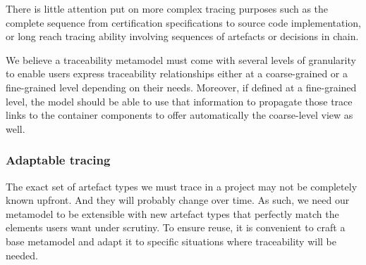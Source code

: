 There is little attention put on more complex tracing purposes such as the complete sequence from certification specifications to source code implementation, or long reach tracing ability involving sequences of artefacts or decisions in chain. %

We believe a traceability metamodel must come with several levels of granularity to enable users express traceability relationships either at a coarse-grained or a fine-grained level depending on their needs. Moreover, if defined at a fine-grained level, the model should be able to use that information to propagate those trace links to the container components to offer automatically the coarse-level view as well.

\subsubsection{Adaptable tracing} 
The exact set of artefact types we must trace in a project may not be completely known upfront. And they will probably change over time. As such, we need our metamodel to be extensible with new artefact types that perfectly match the elements users want under scrutiny.  
To ensure reuse, it is convenient to craft a base metamodel and adapt it to specific situations where traceability will be needed. 

